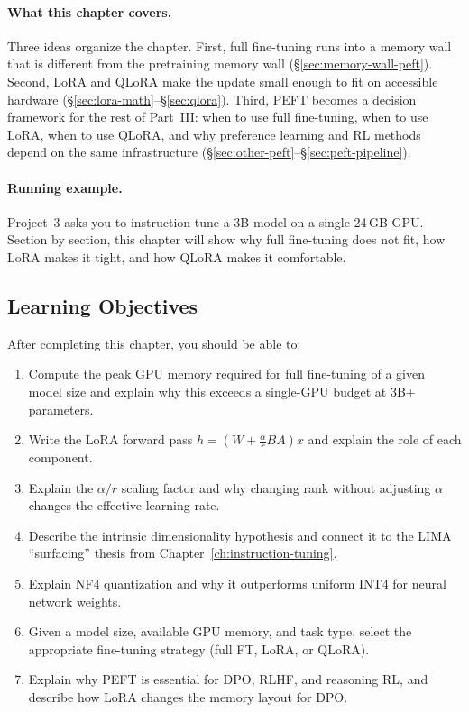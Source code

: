 \paragraph{What this chapter covers.} Three ideas organize the chapter. First, full fine-tuning runs into a memory wall that is different from the pretraining memory wall (\S\ref{sec:memory-wall-peft}). Second, LoRA and QLoRA make the update small enough to fit on accessible hardware (\S\ref{sec:lora-math}--\S\ref{sec:qlora}). Third, PEFT becomes a decision framework for the rest of Part~III: when to use full fine-tuning, when to use LoRA, when to use QLoRA, and why preference learning and RL methods depend on the same infrastructure (\S\ref{sec:other-peft}--\S\ref{sec:peft-pipeline}).

\paragraph{Running example.} Project~3 asks you to instruction-tune a 3B model on a single 24\,GB GPU. Section by section, this chapter will show why full fine-tuning does not fit, how LoRA makes it tight, and how QLoRA makes it comfortable.

\subsection*{Learning Objectives}

After completing this chapter, you should be able to:

\begin{enumerate}
  \item Compute the peak GPU memory required for full fine-tuning of a given model size and explain why this exceeds a single-GPU budget at 3B+ parameters.
  \item Write the LoRA forward pass $h = (W + \frac{\alpha}{r} BA)x$ and explain the role of each component.
  \item Explain the $\alpha/r$ scaling factor and why changing rank without adjusting $\alpha$ changes the effective learning rate.
  \item Describe the intrinsic dimensionality hypothesis and connect it to the LIMA ``surfacing'' thesis from Chapter~\ref{ch:instruction-tuning}.
  \item Explain NF4 quantization and why it outperforms uniform INT4 for neural network weights.
  \item Given a model size, available GPU memory, and task type, select the appropriate fine-tuning strategy (full FT, LoRA, or QLoRA).
  \item Explain why PEFT is essential for DPO, RLHF, and reasoning RL, and describe how LoRA changes the memory layout for DPO.
\end{enumerate}


